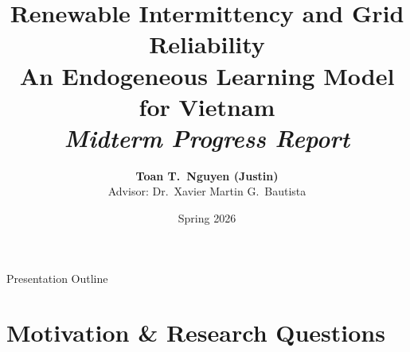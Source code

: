 \documentclass[aspectratio=169,10pt]{beamer}
\title[Vietnam DSGE --- Midterm Update]{%
  \textbf{Renewable Intermittency and Grid Reliability}\\[4pt]
  \normalsize An Endogeneous Learning Model for Vietnam\\[2pt]
  \small\textit{Midterm Progress Report}%
}
\author[Toan T.\ Nguyen]{%
  \textbf{Toan T.\ Nguyen (Justin)}\\[2pt]
  {\small Advisor: Dr.\ Xavier Martin G.\ Bautista}%
}
\institute[Fulbright University Vietnam]{%
  Fulbright University Vietnam
}
\date{Spring 2026}
\begin{document}

\begin{frame}[plain]
  \titlepage
\end{frame}

\begin{frame}{Presentation Outline}
  \tableofcontents[hideallsubsections]
\end{frame}

\section{Motivation \& Research Questions}
\end{document}
